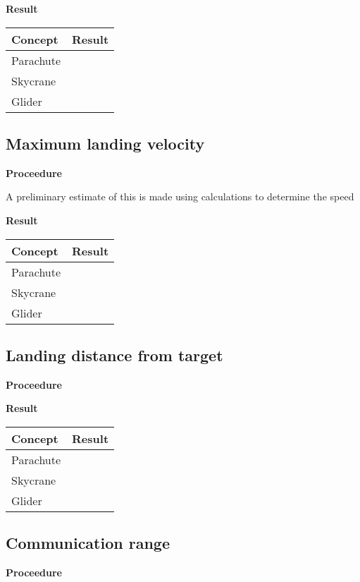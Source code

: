 \documentclass[]{auvsi_doc}
\begin{document}
	\textbf{Result}
	
	\begin{tabular}{|l|l|}
		\hline
		\textbf{Concept}       & \textbf{Result} \\
		\hline
		Parachute              &                 \\
		Skycrane               &                 \\
		Glider                 &				 \\
		\hline
	\end{tabular}

	\subsection{Maximum landing velocity}
	\textbf{Proceedure}
	
	A preliminary estimate of this is made using calculations to determine the speed 

	\textbf{Result}

	\begin{tabular}{|l|l|}
		\hline
		\textbf{Concept}       & \textbf{Result} \\
		\hline
		Parachute              &                 \\
		Skycrane               &                 \\
		Glider                 &				 \\
		\hline
	\end{tabular}

	\subsection{Landing distance from target}
	\textbf{Proceedure}

	\textbf{Result}

	\begin{tabular}{|l|l|}
		\hline
		\textbf{Concept}       & \textbf{Result} \\
		\hline
		Parachute              &                 \\
		Skycrane               &                 \\
		Glider                 &				 \\
		\hline
	\end{tabular}

	\subsection{Communication range}
	\textbf{Proceedure}
\end{document}
